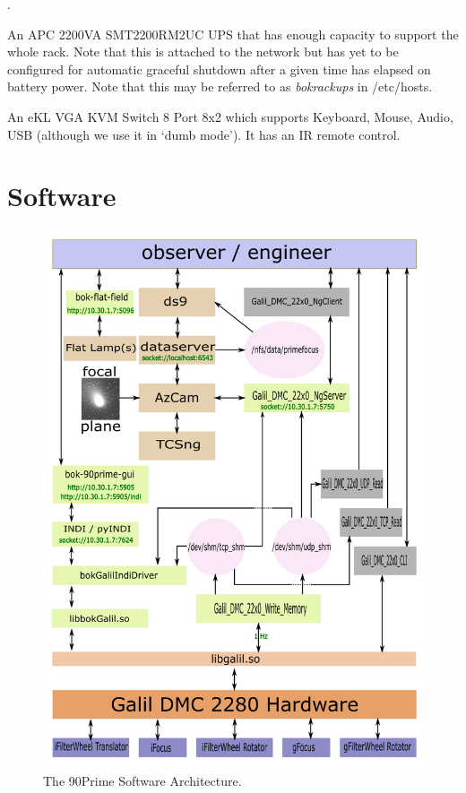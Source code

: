 \documentclass[12pt,twoside]{article}
\begin{document}
\begin{description}
              .
\item[\sfmagenta{bokups}] An APC 2200VA SMT2200RM2UC UPS that has enough capacity to support the whole rack. Note that this is
              attached to the network but has yet to be configured for automatic graceful shutdown after a given time has
              elapsed on battery power. Note that this may be referred to as \emph{bokrackups} in /etc/hosts.
\item[\sfmagenta{bokkvm}] An eKL VGA KVM Switch 8 Port 8x2 which supports Keyboard, Mouse, Audio, USB (although we use it in
              `dumb mode'). It has an IR remote control.
\end{description}

\section{Software}
\label{Software}

\begin{figure}
 \centering
 \includegraphics[angle=0,scale=0.75]{bokGalilIndiDriver.png}
 \caption{The 90Prime Software Architecture.}
 \label{bokGalilIndiDriver}
\end{figure}
\end{document}
